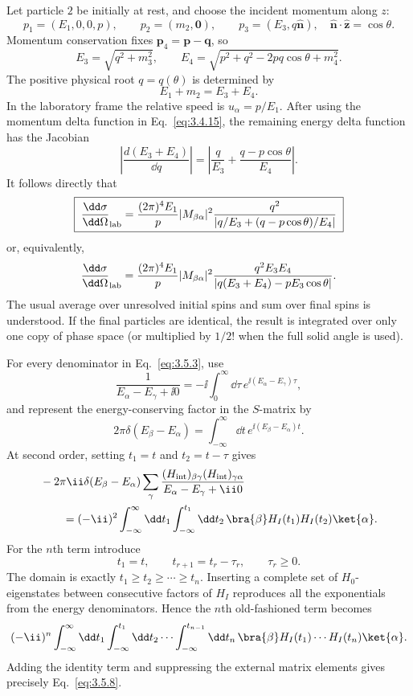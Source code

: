 \begin{enumerate}
Let particle \(2\) be initially at rest, and choose the incident momentum
along \(z\):
\[
 p_1=(E_1,0,0,p),\qquad p_2=(m_2,\mathbf0),\qquad
 p_3=(E_3,q\widehat{\mathbf n}),\quad
 \widehat{\mathbf n}\cdot\widehat{\mathbf z}=\cos\theta .
\]
Momentum conservation fixes \(\mathbf p_4=\mathbf p-\mathbf q\), so
\[
 E_3=\sqrt{q^2+m_3^2},\qquad
 E_4=\sqrt{p^2+q^2-2pq\cos\theta+m_4^2}.
\]
The positive physical root \(q=q(\theta)\) is determined by
\[
 E_1+m_2=E_3+E_4.
\]
In the laboratory frame the relative speed is \(u_\alpha=p/E_1\).
After using the momentum delta function in Eq.~\eqref{eq:3.4.15}, the
remaining energy delta function has the Jacobian
\[
 \left|\frac{d(E_3+E_4)}{\dd q}\right|
 =\left|\frac q{E_3}+\frac{q-p\cos\theta}{E_4}\right|.
\]
It follows directly that
\[
 \boxed{\;
 \frac{\dd\sigma}{\dd\Omega}_{\rm lab}
 =\frac{(2\pi)^4E_1}{p}|M_{\beta\alpha}|^2
 \frac{q^2}
 {\left|q/E_3+(q-p\cos\theta)/E_4\right|}
 \;}
\]
or, equivalently,
\[
 \frac{\dd\sigma}{\dd\Omega}_{\rm lab}
 =\frac{(2\pi)^4E_1}{p}|M_{\beta\alpha}|^2
 \frac{q^2E_3E_4}
 {|q(E_3+E_4)-pE_3\cos\theta|}.
\]
The usual average over unresolved initial spins and sum over final spins
is understood.  If the final particles are identical, the result is
integrated over only one copy of phase space (or multiplied by
\(1/2!\) when the full solid angle is used).

For every denominator in Eq.~\eqref{eq:3.5.3}, use
\[
 \frac1{E_\alpha-E_\gamma+\ii0}
 =-\ii\int_0^\infty \dd\tau\,
 e^{\ii(E_\alpha-E_\gamma)\tau},
\]
and represent the energy-conserving factor in the \(S\)-matrix by
\[
 2\pi\delta(E_\beta-E_\alpha)
 =\int_{-\infty}^{\infty}\dd t\,e^{\ii(E_\beta-E_\alpha)t}.
\]
At second order, setting \(t_1=t\) and \(t_2=t-\tau\) gives
\[
 \begin{split}
 &-2\pi \ii\delta(E_\beta-E_\alpha)
 \sum_\gamma\frac{(H_{\rm int})_{\beta\gamma}
 (H_{\rm int})_{\gamma\alpha}}
 {E_\alpha-E_\gamma+\ii0}\\
 &\qquad=(-\ii)^2\int_{-\infty}^{\infty}\dd t_1
 \int_{-\infty}^{t_1}\dd t_2\,
 \bra{\beta}H_I(t_1)H_I(t_2)\ket{\alpha} .
 \end{split}
\]
For the \(n\)th term introduce
\[
 t_1=t,\qquad
 t_{r+1}=t_r-\tau_r,\qquad \tau_r\geq0.
\]
The domain is exactly
\(t_1\geq t_2\geq\cdots\geq t_n\).  Inserting a complete set of
\(H_0\)-eigenstates between consecutive factors of \(H_I\) reproduces
all the exponentials from the energy denominators.  Hence the \(n\)th
old-fashioned term becomes
\[
 (-\ii)^n\int_{-\infty}^{\infty}\dd t_1
 \int_{-\infty}^{t_1}\dd t_2\cdots
 \int_{-\infty}^{t_{n-1}}\dd t_n\,
 \bra{\beta}H_I(t_1)\cdots H_I(t_n)\ket{\alpha} .
\]
Adding the identity term and suppressing the external matrix elements
gives precisely Eq.~\eqref{eq:3.5.8}.


\end{enumerate}
